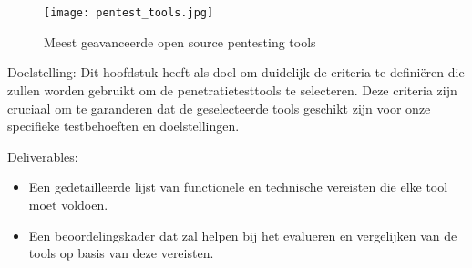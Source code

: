 
\chapter{}%
\label{ch:methodologie}

\section{}
\begin{figure}
    \centering
    \texttt{[image: pentest\_tools.jpg]}
    \caption[Meest geavanceerde open source pentesting tools]{Meest geavanceerde open source pentesting tools}
  \end{figure}
Doelstelling: Dit hoofdstuk heeft als doel om duidelijk de criteria te definiëren die zullen worden gebruikt om de 
penetratietesttools te selecteren. Deze criteria zijn cruciaal om te garanderen dat de geselecteerde tools geschikt 
zijn voor onze specifieke testbehoeften en doelstellingen.

Deliverables:
\begin{itemize}
    \item Een gedetailleerde lijst van functionele en technische vereisten die elke tool moet voldoen.
    \item Een beoordelingskader dat zal helpen bij het evalueren en vergelijken van de tools op basis van deze vereisten.
\end{itemize}

